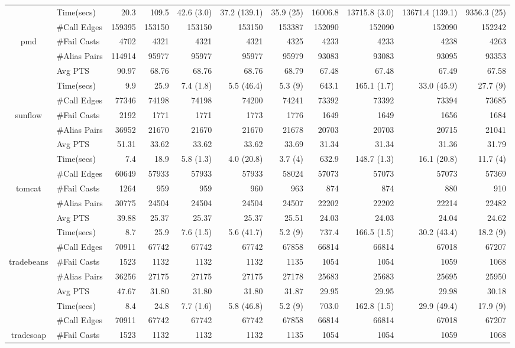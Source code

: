 \begin{table}[]
{\begin{tabular}{|c|l|r||r|>{\columncolor{pink!35}}r|>{\columncolor{lightgray!75}}r|>{\columncolor{orange!15}}r||r|>{\columncolor{pink!35}}r|>{\columncolor{lightgray!75}}r|>{\columncolor{orange!15}}r|}
\hline
&Time(secs)&20.3&109.5&42.6 (3.0)&37.2 (139.1)&35.9 (25)&16006.8&13715.8 (3.0)&13671.4 (139.1)&9356.3 (25)\\
&\#Call Edges&159395&153150&153150&153150&153387&152090&152090&152090&152242\\
pmd&\#Fail Casts&4702&4321&4321&4321&4325&4233&4233&4238&4263\\
&\#Alias Pairs&114914&95977&95977&95977&95979&93083&93083&93095&93353\\
&Avg PTS&90.97&68.76&68.76&68.76&68.79&67.48&67.48&67.49&67.58\\
\hline
&Time(secs)&9.9&25.9&7.4 (1.8)&5.5 (46.4)&5.3 (9)&643.1&165.1 (1.7)&33.0 (45.9)&27.7 (9)\\
&\#Call Edges&77346&74198&74198&74200&74241&73392&73392&73394&73685\\
sunflow&\#Fail Casts&2192&1771&1771&1773&1776&1649&1649&1656&1684\\
&\#Alias Pairs&36952&21670&21670&21670&21678&20703&20703&20715&21041\\
&Avg PTS&51.31&33.62&33.62&33.62&33.69&31.34&31.34&31.36&31.79\\
\hline
&Time(secs)&7.4&18.9&5.8 (1.3)&4.0 (20.8)&3.7 (4)&632.9&148.7 (1.3)&16.1 (20.8)&11.7 (4)\\
&\#Call Edges&60649&57933&57933&57933&58024&57073&57073&57073&57369\\
tomcat&\#Fail Casts&1264&959&959&960&963&874&874&880&910\\
&\#Alias Pairs&30775&24504&24504&24504&24507&22202&22202&22214&22482\\
&Avg PTS&39.88&25.37&25.37&25.37&25.51&24.03&24.03&24.04&24.62\\
\hline
&Time(secs)&8.7&25.9&7.6 (1.5)&5.6 (41.7)&5.2 (9)&737.4&166.5 (1.5)&30.2 (43.4)&18.2 (9)\\
&\#Call Edges&70911&67742&67742&67742&67858&66814&66814&67018&67207\\
tradebeans&\#Fail Casts&1523&1132&1132&1132&1135&1054&1054&1059&1068\\
&\#Alias Pairs&36256&27175&27175&27175&27178&25683&25683&25695&25950\\
&Avg PTS&47.67&31.80&31.80&31.80&31.87&29.95&29.95&29.98&30.18\\
\hline
&Time(secs)&8.4&24.8&7.7 (1.6)&5.8 (46.8)&5.2 (9)&703.0&162.8 (1.5)&29.9 (49.4)&17.9 (9)\\
&\#Call Edges&70911&67742&67742&67742&67858&66814&66814&67018&67207\\
tradesoap&\#Fail Casts&1523&1132&1132&1132&1135&1054&1054&1059&1068\\

\end{tabular}}
\end{table}
